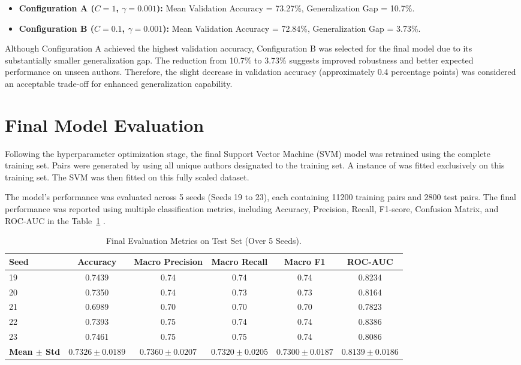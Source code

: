 \documentclass[11pt]{article}
\newcommand{\code}[1]{%
  \tcbox[on line, colback=codebg, colframe=codebg,
         boxrule=0pt, arc=2pt, left=2pt, right=2pt, top=0pt, bottom=0pt]
        {\ttfamily\small #1}}
\begin{document}
\begin{itemize}
    \item \textbf{Configuration A ($C = 1$, $\gamma = 0.001$):} Mean Validation Accuracy = 73.27\%, Generalization Gap = 10.7\%.

    \item \textbf{Configuration B ($C = 0.1$, $\gamma = 0.001$):} Mean Validation Accuracy = 72.84\%, Generalization Gap = 3.73\%.
\end{itemize}

Although Configuration A achieved the highest validation accuracy, Configuration B was selected for the final model due to its substantially smaller generalization gap. The reduction from 10.7\% to 3.73\% suggests improved robustness and better expected performance on unseen authors. Therefore, the slight decrease in validation accuracy (approximately 0.4 percentage points) was considered an acceptable trade-off for enhanced generalization capability.

\section{Final Model Evaluation}

Following the hyperparameter optimization stage, the final Support Vector Machine (SVM) model was retrained using the complete training set. Pairs were generated by using all unique authors designated to the training set. A instance of \code{StandardScaler} was fitted exclusively on this training set. The SVM was then fitted on this fully scaled dataset.

The model’s performance was evaluated across 5 seeds (Seeds 19 to 23), each containing 11200 training pairs and 2800 test pairs. The final performance was reported using multiple classification metrics, including Accuracy, Precision, Recall, F1-score, Confusion Matrix, and ROC-AUC in the Table~\ref{tab:finaleval} .

\begin{table}[H]
  \centering
  \small
  \begin{tabular}{@{}lccccc@{}}
    \toprule
    \textbf{Seed} & \textbf{Accuracy} & \textbf{Macro Precision} & \textbf{Macro Recall} & \textbf{Macro F1} & \textbf{ROC-AUC} \\
    \midrule
    19 & 0.7439 & 0.74 & 0.74 & 0.74 & 0.8234 \\
    20 & 0.7350 & 0.74 & 0.73 & 0.73 & 0.8164 \\
    21 & 0.6989 & 0.70 & 0.70 & 0.70 & 0.7823 \\
    22 & 0.7393 & 0.75 & 0.74 & 0.74 & 0.8386 \\
    23 & 0.7461 & 0.75 & 0.75 & 0.74 & 0.8086 \\
    \midrule
    \textbf{Mean $\pm$ Std} & \textbf{$0.7326\pm0.0189$} & \textbf{$0.7360\pm0.0207$} & \textbf{$0.7320\pm0.0205$} & \textbf{$0.7300\pm0.0187$} & \textbf{$0.8139\pm0.0186$} \\
    \bottomrule
  \end{tabular}
  \caption{Final Evaluation Metrics on Test Set (Over 5 Seeds).}
  \label{tab:finaleval}
\end{table}
\end{document}

